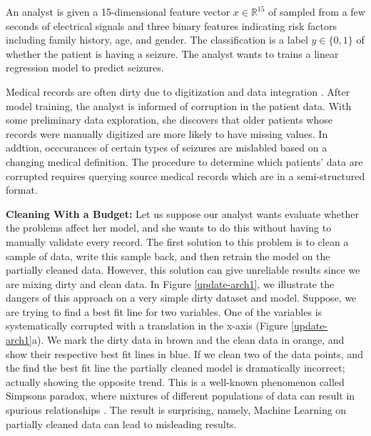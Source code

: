 \begin{example}
An analyst is given a 15-dimensional feature vector $x \in \mathbb{R}^{15}$ of sampled from a few seconds of electrical signals and three binary features indicating risk factors including family history, age, and gender.
The classification is a label $y\in \{0,1\}$ of whether the patient is having a seizure.
The analyst wants to trains a linear regression model to predict seizures.

Medical records are often dirty due to digitization and data integration \cite{fortunearticle}.
After model training, the analyst is informed of corruption in the patient data.
With some preliminary data exploration, she discovers that older patients whose records were manually digitized are more likely to have missing values.
In addtion, occcurances of certain types of seizures are mislabled based on a changing medical definition.
The procedure to determine which patients' data are corrupted requires querying source medical records which are in a semi-structured format.
\end{example}

\noindent\textbf{Cleaning With a Budget: }  Let us suppose our analyst wants evaluate whether the problems affect her model, and she wants to do this without having to manually validate every record. The first solution to this problem is to clean a sample of data, write this sample back, and then retrain the model on the partially cleaned data.
However, this solution can give unreliable results since we are mixing dirty and clean data.
In Figure \ref{update-arch1}, we illustrate the dangers of this approach on a very simple dirty dataset and model.
Suppose, we are trying to find a best fit line for two variables. 
One of the variables is systematically corrupted with a translation in the x-axis (Figure \ref{update-arch1}a).
We mark the dirty data in brown and the clean data in orange, and show their respective best fit lines in blue.
If we clean two of the data points, and the find the best fit line the partially cleaned model is dramatically incorrect; actually showing the opposite trend.
This is a well-known phenomenon called Simpsons paradox, where mixtures of different populations of data can result in spurious relationships \cite{simpson1951interpretation}.
The result is surprising, namely, Machine Learning on partially cleaned data can lead to misleading results.

